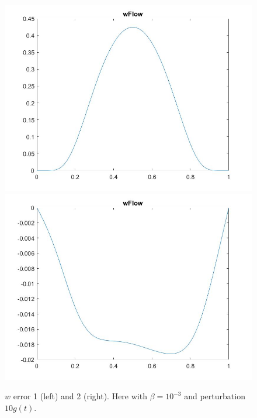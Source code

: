 \documentclass[11pt, a4paper]{article}
\theoremstyle{definition}
\begin{document}
\begin{figure}[h]
	\includegraphics[scale=0.3]{KalDneww1.jpg}
	\includegraphics[scale=0.3]{KalDneww2.jpg}
	\caption{$w$ error 1 (left) and 2 (right). Here with $\beta =10^{-3}$ and perturbation $10g(t)$.}
	\label{Figlint4d}
\end{figure}
\end{document}

